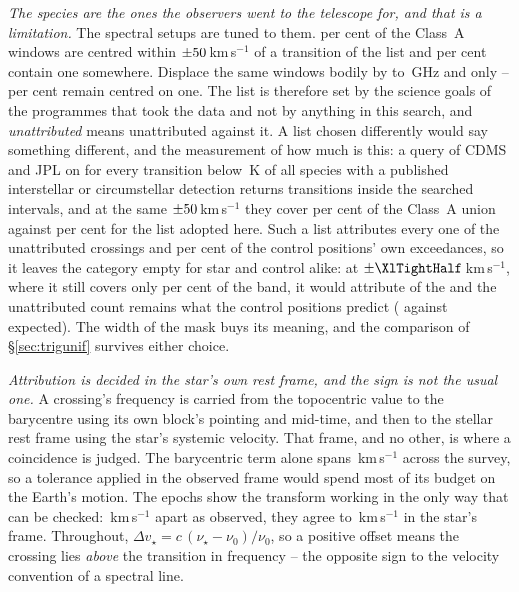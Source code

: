 \emph{The species are the ones the observers went to the telescope for, and
that is a limitation.} The spectral setups are tuned to them. \TnCenPct{} per
cent of the \NWinA{} Class~A windows are centred within
$\pm50$\,km\,s$^{-1}$ of a transition of the list and \TnWinPct{}
per cent contain one somewhere. Displace the same windows bodily by
\TnShiftLoGHz{} to \TnShiftHiGHz\,GHz and only
\TnCtrlCenLo--\TnCtrlCenHi{} per cent remain centred on one. The list is therefore set by the science goals of the programmes that took
the data and not by anything in this search, and \emph{unattributed} means
unattributed against it. A list chosen differently would say something
different, and the measurement of how much is this: a query of CDMS and JPL
\citep{Pickett1998,CDMS2005} on \XlQueryDate{} for every transition below
\XlEuMax\,K of all \XlNSpecies{} species with a published interstellar or
circumstellar detection returns \XlNTrans{} transitions inside the searched
intervals, and at the same $\pm50$\,km\,s$^{-1}$ they cover
\XlBandPct{} per cent of the Class~A union against \MkMaskAPct{} per
cent for the list adopted here. Such a list attributes every one of the
\MkUnattr{} unattributed crossings and \XlShareWidePct{} per cent of the
control positions' own exceedances, so it leaves the category empty for star
and control alike: at $\pm\XlTightHalf$\,km\,s$^{-1}$, where it still covers
only \XlTightBandPct{} per cent of the band, it would attribute
\XlTightNIn{} of the \MkUnattr{} and the unattributed count remains what the
control positions predict (\XlTightObs{} against \XlTightExp{} expected).
The width of the mask buys its meaning, and the comparison of
\S\ref{sec:trigunif} survives either choice.

\emph{Attribution is decided in the star's own rest frame, and the sign is
not the usual one.} A crossing's frequency is carried from the topocentric
value to the barycentre using its own block's pointing and mid-time, and then
to the stellar rest frame using the star's systemic velocity. That frame, and
no other, is where a coincidence is judged.
The barycentric term alone spans \FrBarySwing\,km\,s$^{-1}$ across the
survey, so a tolerance applied in the observed frame would spend most of its
budget on the Earth's motion. The \FrEpochNEpoch{} \FrEpochStar{} epochs show
the transform working in the only way that can be checked:
\FrEpochTopoKms\,km\,s$^{-1}$ apart as observed, they agree to
\FrEpochStelKms\,km\,s$^{-1}$ in the star's frame.
Throughout, $\Delta v_\star = c\,(\nu_\star-\nu_0)/\nu_0$, so a positive
offset means the crossing lies \emph{above} the transition in frequency --
the opposite sign to the velocity convention of a spectral line.


